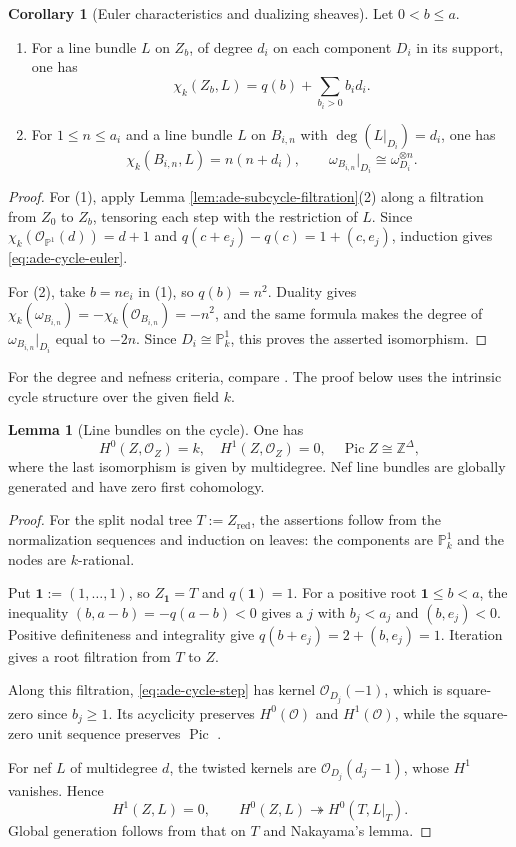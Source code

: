 \documentclass[a4paper,reqno]{amsart}
\def\O{\mathcal{O}}
\DeclareMathOperator{\Pic}{Pic}
\theoremstyle{definition}
\newtheorem{Lem}[Thm]{Lemma}
\newtheorem{Cor}[Thm]{Corollary}
\begin{document}
\begin{Cor}[Euler characteristics and dualizing sheaves]\label{cor:ade-cycle-euler}
Let $0<b\le a$.
\begin{enumerate}
\item For a line bundle $L$ on $Z_b$, of degree $d_i$ on each component $D_i$ in its support, one has
\begin{equation}\label{eq:ade-cycle-euler}
\chi_k(Z_b,L)=q(b)+\sum_{b_i>0}b_i d_i.
\end{equation}
\item For $1\le n\le a_i$ and a line bundle $L$ on $B_{i,n}$ with $\deg(L|_{D_i})=d_i$, one has
\[
\chi_k(B_{i,n},L)=n(n+d_i),
\qquad
\omega_{B_{i,n}}|_{D_i}\cong\omega_{D_i}^{\otimes n}.
\]
\end{enumerate}
\end{Cor}
\begin{proof}
For (1), apply Lemma \ref{lem:ade-subcycle-filtration}(2) along a filtration from $Z_0$ to $Z_b$, tensoring each step with the restriction of $L$. Since $\chi_k(\O_{\mathbb P^1}(d))=d+1$ and $q(c+e_j)-q(c)=1+(c,e_j)$, induction gives \eqref{eq:ade-cycle-euler}.

For (2), take $b=ne_i$ in (1), so $q(b)=n^2$. Duality gives $\chi_k(\omega_{B_{i,n}})=-\chi_k(\O_{B_{i,n}})=-n^2$, and the same formula makes the degree of $\omega_{B_{i,n}}|_{D_i}$ equal to $-2n$. Since $D_i\cong\mathbb P^1_k$, this proves the asserted isomorphism.
\end{proof}

For the degree and nefness criteria, compare \cite[Lemmas 3.4.3--3.4.5]{VdB04b}. The proof below uses the intrinsic cycle structure over the given field $k$.

\begin{Lem}[Line bundles on the cycle]\label{lem:ade-cycle-calculations}
One has
\[
H^0(Z,\O_Z)=k,\quad H^1(Z,\O_Z)=0,\quad
\Pic Z\cong\mathbb Z^\Delta,
\]
where the last isomorphism is given by multidegree. Nef line bundles are globally generated and have zero first cohomology.
\end{Lem}
\begin{proof}
For the split nodal tree $T:=Z_{\mathrm{red}}$, the assertions follow from the normalization sequences and induction on leaves: the components are $\mathbb P^1_k$ and the nodes are $k$-rational.

Put $\mathbf1:=(1,\ldots,1)$, so $Z_{\mathbf1}=T$ and $q(\mathbf1)=1$. For a positive root $\mathbf1\le b<a$, the inequality $(b,a-b)=-q(a-b)<0$ gives a $j$ with $b_j<a_j$ and $(b,e_j)<0$. Positive definiteness and integrality give $q(b+e_j)=2+(b,e_j)=1$. Iteration gives a root filtration from $T$ to $Z$.

Along this filtration, \eqref{eq:ade-cycle-step} has kernel $\O_{D_j}(-1)$, which is square-zero since $b_j\ge1$. Its acyclicity preserves $H^0(\O)$ and $H^1(\O)$, while the square-zero unit sequence preserves $\Pic$ \cite[Tag 0C6R]{stacks-project}.

For nef $L$ of multidegree $d$, the twisted kernels are $\O_{D_j}(d_j-1)$, whose $H^1$ vanishes. Hence
\[
H^1(Z,L)=0,\qquad
H^0(Z,L)\twoheadrightarrow H^0(T,L|_T).
\]
Global generation follows from that on $T$ and Nakayama's lemma.
\end{proof}
\end{document}
